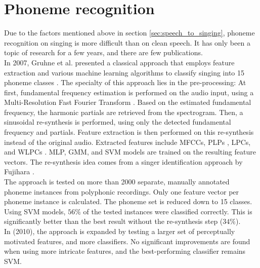 

\section{Phoneme recognition} \label{sec:sota_phone}
Due to the factors mentioned above in section \ref{sec:speech_to_singing}, phoneme recognition on singing is more difficult than on clean speech. It has only been a topic of research for a few years, and there are few publications.\\
In 2007, Gruhne et al. presented a classical approach that employs feature extraction and various machine learning algorithms to classify singing into 15 phoneme classes \cite{Gruhne2007} \cite{Gruhne2007a}. The specialty of this approach lies in the pre-processing: At first, fundamental frequency estimation is performed on the audio input, using a Multi-Resolution Fast Fourier Transform \cite{inproceedings:dressler}. Based on the estimated fundamental frequency, the harmonic partials are retrieved from the spectrogram. Then, a sinusoidal re-synthesis is performed, using only the detected fundamental frequency and partials. Feature extraction is then performed on this re-synthesis instead of the original audio. Extracted features include MFCCs, PLPs \cite{plp2}, LPCs, and WLPCs \cite{lpc}. MLP, GMM, and SVM models are trained on the resulting feature vectors. The re-synthesis idea comes from a singer identification approach by Fujihara \cite{fujihara_identification}.\\
The approach is tested on more than 2000 separate, manually annotated phoneme instances from polyphonic recordings. Only one feature vector per phoneme instance is calculated. The phoneme set is reduced down to 15 classes. Using SVM models, $56\%$ of the tested instances were classified correctly. This is significantly better than the best result without the re-synthesis step ($34\%$).\\
In \cite{szepannek} (2010), the approach is expanded by testing a larger set of perceptually motivated features, and more classifiers. No significant improvements are found when using more intricate features, and the best-performing classifier remains SVM.\\
